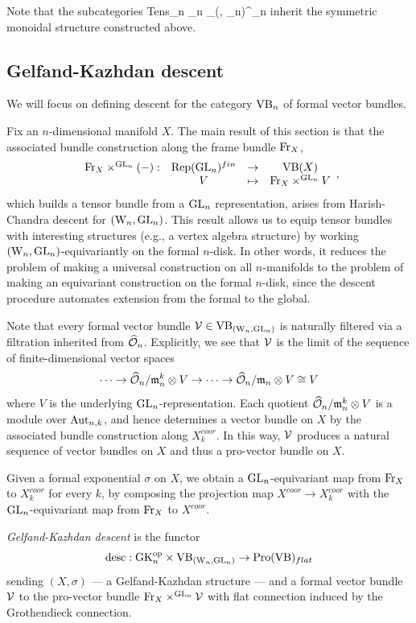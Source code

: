 Note that the subcategories 
\ben
{\rm Tens}_n \hookrightarrow \VB_n
\hookrightarrow \Mod_{(\Vect, \GL_n)}^{\hO_n}
\een
inherit the symmetric monoidal structure constructed above. 

\subsection{Gelfand-Kazhdan descent}

We will focus on defining descent for the category ${\rm VB}_n$ of formal vector
bundles. 

Fix an $n$-dimensional manifold $X$.
The main result of this section is that the associated bundle construction along the frame bundle ${\rm Fr}_X$,
\[
\begin{array}{cccc}
{\rm Fr}_X \times^{{\rm GL}_n} (-) :&  {\rm Rep}({\rm GL}_n)^{fin} & \to &{\rm VB}(X)\\
& V & \mapsto & {\rm Fr}_X \times^{{\rm GL}_n} V
\end{array},
\]
which builds a tensor bundle from a ${\rm GL}_n$ representation, arises from Harish-Chandra descent for $({{\rm W}_n},{\rm GL}_n)$. 
This result allows us to equip tensor bundles with interesting structures (e.g., a vertex algebra structure) by working $({{\rm W}_n},{\rm GL}_n)$-equivariantly on the formal $n$-disk.
In other words, it reduces the problem of making a universal
construction on all $n$-manifolds to the problem of making an
equivariant construction on the formal $n$-disk,
since the descent procedure automates extension from the formal to the global.

Note that every formal vector bundle $\mathcal{V} \in {\rm VB}_{({{\rm W}_n}, {\rm GL}_n)}$ is naturally filtered via a filtration inherited from $\widehat{\mathcal O}_n$. 
Explicitly, we see that $\mathcal{V}$ is the limit of the sequence of finite-dimensional vector spaces
\[
\cdots \to \widehat{\mathcal O}_n/{\mathfrak m}_n^k \otimes V \to \cdots \to \widehat{\mathcal O}_n/{\mathfrak m}_n \otimes V \cong V
\]
where $V$ is the underlying ${\rm GL}_n$-representation.
Each quotient $\widehat{\mathcal O}_n/{\mathfrak m}_n^k \otimes V$ is a module over ${\rm Aut}_{n,k}$, and 
hence determines a vector bundle on $X$ by the associated bundle construction along $X^{coor}_k$.
In this way, $\mathcal{V}$ produces a natural sequence of vector bundles on $X$ and thus a pro-vector bundle on $X$.

Given a formal exponential $\sigma$ on $X$, we obtain a ${\rm GL}_n$-equivariant map from ${\rm Fr}_X$ to $X^{coor}_k$ for every $k$,
by composing the projection map $X^{coor} \to X_k^{coor}$ with the ${\rm GL}_n$-equivariant map from ${\rm Fr}_X$ to $X^{coor}$.

\begin{dfn}
{\em Gelfand-Kazhdan descent} is the functor
\[
{\rm desc} : {\rm GK}_n^{{\rm op}} \times {\rm VB}_{({{\rm W}_n}, {\rm GL}_n)} \to {\rm Pro}({\rm VB})_{flat}
\]
sending $(X,\sigma)$ --- a Gelfand-Kazhdan structure
--- and a formal vector bundle $\mathcal{V}$ 
to the pro-vector bundle ${\rm Fr}_X \times^{{\rm GL}_n} \mathcal{V}$ with flat connection induced by the Grothendieck connection.
\end{dfn}


